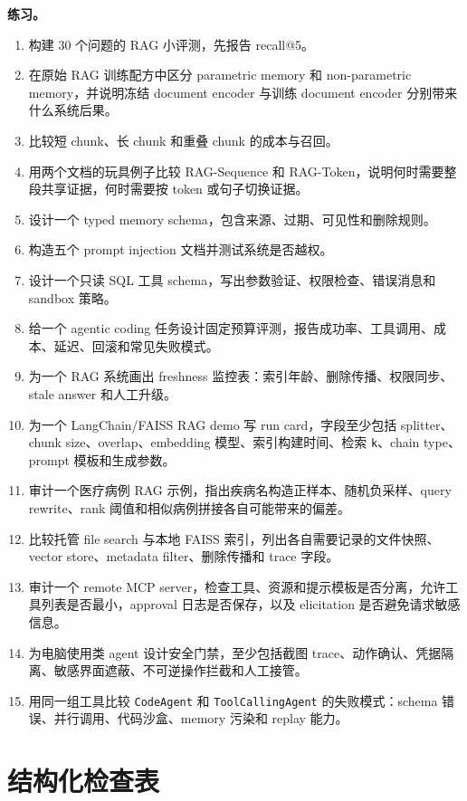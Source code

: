 \documentclass[UTF8,zihao=-4,openany]{ctexbook}
\begin{document}
\textbf{练习。}
\begin{enumerate}
\item 构建 30 个问题的 RAG 小评测，先报告 recall@5。
\item 在原始 RAG 训练配方中区分 parametric memory 和 non-parametric memory，并说明冻结 document encoder 与训练 document encoder 分别带来什么系统后果。
\item 比较短 chunk、长 chunk 和重叠 chunk 的成本与召回。
\item 用两个文档的玩具例子比较 RAG-Sequence 和 RAG-Token，说明何时需要整段共享证据，何时需要按 token 或句子切换证据。
\item 设计一个 typed memory schema，包含来源、过期、可见性和删除规则。
\item 构造五个 prompt injection 文档并测试系统是否越权。
\item 设计一个只读 SQL 工具 schema，写出参数验证、权限检查、错误消息和 sandbox 策略。
\item 给一个 agentic coding 任务设计固定预算评测，报告成功率、工具调用、成本、延迟、回滚和常见失败模式。
\item 为一个 RAG 系统画出 freshness 监控表：索引年龄、删除传播、权限同步、stale answer 和人工升级。
\item 为一个 LangChain/FAISS RAG demo 写 run card，字段至少包括 splitter、chunk size、overlap、embedding 模型、索引构建时间、检索 \texttt{k}、chain type、prompt 模板和生成参数。
\item 审计一个医疗病例 RAG 示例，指出疾病名构造正样本、随机负采样、query rewrite、rank 阈值和相似病例拼接各自可能带来的偏差。
\item 比较托管 file search 与本地 FAISS 索引，列出各自需要记录的文件快照、vector store、metadata filter、删除传播和 trace 字段。
\item 审计一个 remote MCP server，检查工具、资源和提示模板是否分离，允许工具列表是否最小，approval 日志是否保存，以及 elicitation 是否避免请求敏感信息。
\item 为电脑使用类 agent 设计安全门禁，至少包括截图 trace、动作确认、凭据隔离、敏感界面遮蔽、不可逆操作拦截和人工接管。
\item 用同一组工具比较 \texttt{CodeAgent} 和 \texttt{ToolCallingAgent} 的失败模式：schema 错误、并行调用、代码沙盒、memory 污染和 replay 能力。
\end{enumerate}

\section{结构化检查表}
\end{document}
